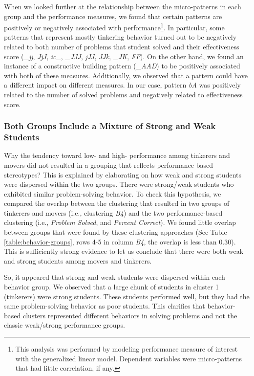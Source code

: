 \documentclass{sigchi}
\begin{document}
When we looked further at the relationship between the micro-patterns in each group and the performance measures, we found that certain patterns are positively or negatively associated with performance\footnote{This analysis was performed by modeling performance measure of interest with the generalized linear model. Dependent variables were micro-patterns that had little correlation, if any.}. In particular, some patterns that represent mostly tinkering behavior turned out to be negatively related to both number of problems that student solved and their effectiveness score (\textit{{\_}jj}, \textit{JjJ}, \textit{ic{\_}}, \textit{{\_}JJJ}, \textit{jJJ}, \textit{JJk}, \textit{{\_}JK}, \textit{FF}). On the other hand, we found an instance of a constructive building pattern (\textit{{\_}AAD}) to be positively associated with both of these measures. Additionally, we observed that a pattern could have a different impact on different measures. In our case, pattern \textit{bA} was positively related to the number of solved problems and negatively related to effectiveness score.

\subsubsection{Both Groups Include a Mixture of Strong and Weak Students}

Why the tendency toward low- and high- performance among tinkerers and movers did not resulted in a grouping that reflects performance-based stereotypes? This is explained by elaborating on how weak and strong students were dispersed within the two groups. There were strong/weak students who exhibited similar problem-solving behavior. To check this hypothesis, we compared the overlap between the clustering that resulted in two groups of tinkerers and movers (i.e., clustering \textit{B4}) and the two performance-based clustering (i.e., \textit{Problem Solved}, and \textit{Percent Correct}). We found little overlap between groups that were found by these clustering approaches (See Table \ref{table:behavior-groups}, rows 4-5 in column \textit{B4}, the overlap is less than 0.30). This is sufficiently strong evidence to let us conclude that there were both weak and strong students among movers and tinkerers. 

So, it appeared that strong and weak students were dispersed within each behavior group. We observed that a large chunk of students in cluster 1 (tinkerers) were strong students. These students performed well, but they had the same problem-solving behavior as poor students. This clarifies that behavior-based clusters represented different behaviors in solving problems and not the classic weak/strong performance groups. %
\end{document}
